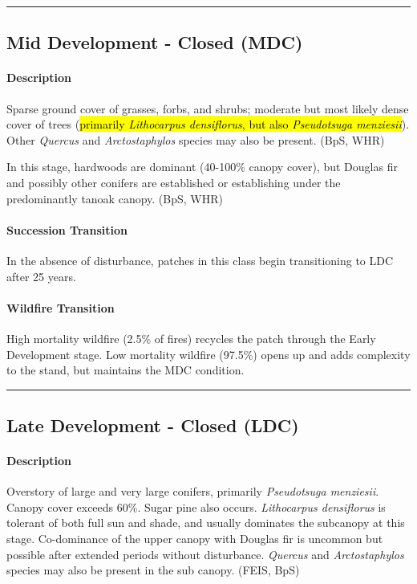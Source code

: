 \documentclass{article}
\begin{document}
\noindent\rule{6.5in}{.02pt}



\subsection*{Mid Development - Closed (MDC)}

\paragraph{Description}
Sparse ground cover of grasses, forbs, and shrubs; moderate but most likely dense cover of trees (\hl{primarily \emph{Lithocarpus densiflorus}, but also \emph{Pseudotsuga menziesii}}). Other \emph{Quercus} and \emph{Arctostaphylos} species may also be present. (BpS, WHR)

In this stage, hardwoods are dominant (40-100\% canopy cover), but Douglas fir and possibly other conifers are established or establishing under the predominantly tanoak canopy. (BpS, WHR)


\paragraph{Succession Transition} In the absence of disturbance, patches in this class begin transitioning to LDC after 25 years.

\paragraph{Wildfire Transition} High mortality wildfire (2.5\% of fires) recycles the patch through the Early Development stage. Low mortality wildfire (97.5\%) opens up and adds complexity to the stand, but maintains the MDC condition.

\noindent\rule{6.5in}{.02pt}


\subsection*{Late Development - Closed (LDC)}

\paragraph{Description} Overstory of large and very large conifers, primarily \emph{Pseudotsuga menziesii}. Canopy cover exceeds 60\%. Sugar pine also occurs. \emph{Lithocarpus densiflorus} is tolerant of both full sun and shade, and usually dominates the subcanopy at this stage. Co-dominance of the upper canopy with Douglas fir is uncommon but possible after extended periods without disturbance. \emph{Quercus} and \emph{Arctostaphylos} species may also be present in the sub canopy. (FEIS, BpS)
\end{document}
